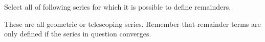 \documentclass{ximera}
\author{Jim Talamo}
\begin{document}
\begin{exercise}

Select all of following series for which it is possible to define remainders.

\begin{selectAll}

\end{selectAll}

\begin{hint}
These are all geometric or telescoping series.  Remember that remainder terms are only defined if the series in question converges.
\end{hint}
\end{exercise}
\end{document}
